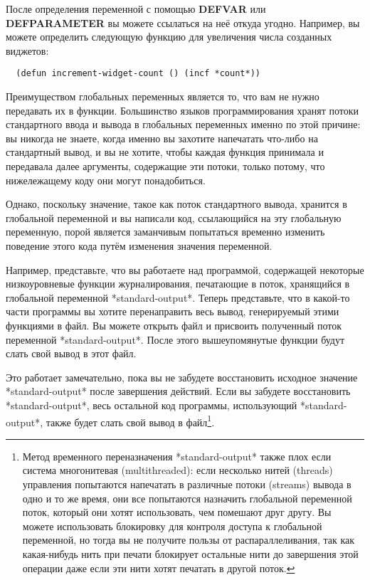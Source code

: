 После определения переменной с помощью \textbf{DEFVAR} или \textbf{DEFPARAMETER} вы можете
ссылаться на неё откуда угодно. Например, вы можете определить следующую функцию для
увеличения числа созданных виджетов:

\begin{lstlisting}
  (defun increment-widget-count () (incf *count*))
\end{lstlisting}

Преимуществом глобальных переменных является то, что вам не нужно передавать их в
функции. Большинство языков программирования хранят потоки стандартного ввода и вывода в
глобальных переменных именно по этой причине: вы никогда не знаете, когда именно вы
захотите напечатать что-либо на стандартный вывод, и вы не хотите, чтобы каждая функция
принимала и передавала далее аргументы, содержащие эти потоки, только потому, что
нижележащему коду они могут понадобиться.

Однако, поскольку значение, такое как поток стандартного вывода, хранится в глобальной
переменной и вы написали код, ссылающийся на эту глобальную переменную, порой является
заманчивым попытаться временно изменить поведение этого кода путём изменения значения
переменной.

Например, представьте, что вы работаете над программой, содержащей некоторые
низкоуровневые функции журналирования, печатающие в поток, хранящийся в глобальной
переменной *standard-output*. Теперь представьте, что в какой-то части программы вы хотите
перенаправить весь вывод, генерируемый этими функциями в файл. Вы можете открыть файл и
присвоить полученный поток переменной *standard-output*. После этого вышеупомянутые
функции будут слать свой вывод в этот файл.

Это работает замечательно, пока вы не забудете восстановить исходное значение
*standard-output* после завершения действий. Если вы забудете восстановить
*standard-output*, весь остальной код программы, использующий *standard-output*, также
будет слать свой вывод в файл\footnote{Метод временного переназначения *standard-output*
  также плох если система многонитевая (multithreaded): если несколько нитей (threads)
  управления попытаются напечатать в различные потоки (streams) вывода в одно и то же
  время, они все попытаются назначить глобальной переменной поток, который они хотят
  использовать, чем помешают друг другу. Вы можете использовать блокировку для контроля
  доступа к глобальной переменной, но тогда вы не получите пользы от распараллеливания,
  так как какая-нибудь нить при печати блокирует остальные нити до завершения этой
  операции даже если эти нити хотят печатать в другой поток.}.

